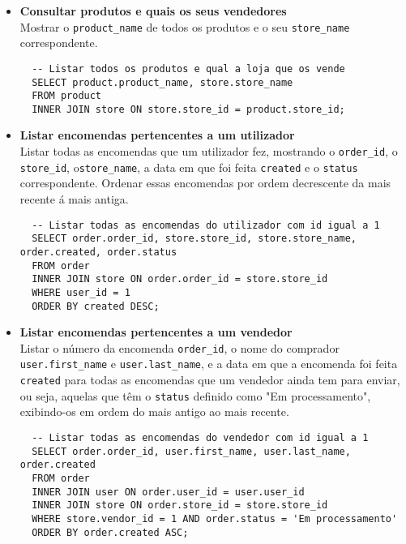 \begin{itemize}
  \item \textbf{Consultar produtos e quais os seus vendedores}\\ 
    Mostrar o \texttt{product\_name} de todos os produtos e o seu \texttt{store\_name} correspondente.
    \vspace{10pt}
    \begin{lstlisting}
  -- Listar todos os produtos e qual a loja que os vende
  SELECT product.product_name, store.store_name
  FROM product
  INNER JOIN store ON store.store_id = product.store_id;
      \end{lstlisting}

  \item \textbf{Listar encomendas pertencentes a um utilizador}\\ 
    Listar todas as encomendas que um utilizador fez, mostrando o \texttt{order\_id}, o \texttt{store\_id}, o\texttt{store\_name}, a data em que foi feita \texttt{created} e o \texttt{status} correspondente. Ordenar essas encomendas por ordem decrescente da mais recente á mais antiga.
    \vspace{10pt}
    \begin{lstlisting}
  -- Listar todas as encomendas do utilizador com id igual a 1
  SELECT order.order_id, store.store_id, store.store_name, order.created, order.status
  FROM order
  INNER JOIN store ON order.order_id = store.store_id
  WHERE user_id = 1
  ORDER BY created DESC;
      \end{lstlisting}

  \item \textbf{Listar encomendas pertencentes a um vendedor}\\ 
    Listar o número da encomenda \texttt{order\_id}, o nome do comprador \texttt{user.first\_name} e \texttt{user.last\_name}, e a data em que a encomenda foi feita \texttt{created} para todas as encomendas que um vendedor ainda tem para enviar, ou seja, aquelas que têm o \texttt{status} definido como "Em processamento", exibindo-os em ordem do mais antigo ao mais recente.
      \vspace{10pt}
      \begin{lstlisting}
  -- Listar todas as encomendas do vendedor com id igual a 1
  SELECT order.order_id, user.first_name, user.last_name, order.created
  FROM order
  INNER JOIN user ON order.user_id = user.user_id
  INNER JOIN store ON order.store_id = store.store_id
  WHERE store.vendor_id = 1 AND order.status = 'Em processamento'
  ORDER BY order.created ASC;
        \end{lstlisting}

\end{itemize}






